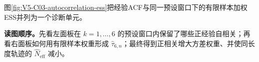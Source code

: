 \documentclass[UTF8,a4paper,11pt,openany]{ctexbook}
\begin{document}
\setcounter{page}{644}
\setcounter{chapter}{32}
\setcounter{figure}{8}
\pagestyle{headings}
\noindent 图\ref{fig:V5-C03-autocorrelation-ess}把经验ACF与同一预设窗口下的有限样本加权ESS并列为一个诊断单元。

\FloatBarrier
\noindent\textbf{读图顺序。}先看左面板在 $k=1,\ldots,6$ 的预设窗口内保留了哪些正经验自相关；再看右面板如何用有限样本权重形成 $\widehat\tau_{6,n}$；最终得到正相关增大方差权重、并使同长度轨迹的 $\widehat N_{\mathrm{eff}}$ 减小。\par
\end{document}
